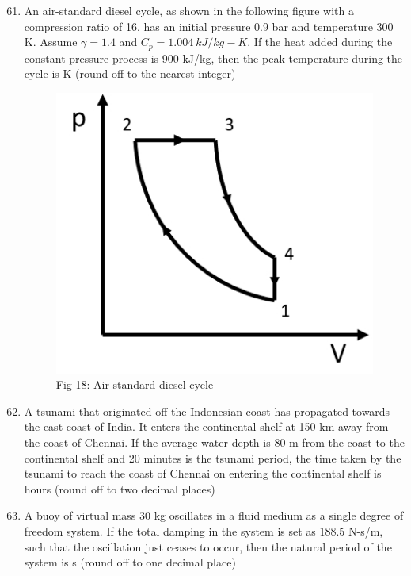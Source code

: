 \documentclass[journal]{IEEEtran}
\theoremstyle{remark}
\begin{document}
\begin{enumerate}[itemsep=1em]
\setcounter{enumi}{60}
\item An air-standard diesel cycle, as shown in the following figure with a compression ratio of 16, has an initial pressure 0.9 bar and temperature 300 K. Assume $\gamma=1.4$ and $C_p = 1.004\ kJ/kg-K$. If the heat added during the constant pressure 
process is 900 kJ/kg, then the peak temperature during the cycle is \underline{\hspace{1cm}} K (round off to the nearest integer) 
\begin{figure}[H]
    \centering
    \includegraphics[width=0.4\columnwidth]{figs/fig-18.jpeg}
    \caption*{Fig-18: Air-standard diesel cycle}
    \label{fig-18}
\end{figure}
\end{enumerate}

\begin{enumerate}[itemsep=1em]
\setcounter{enumi}{61}
\item A tsunami that originated off the Indonesian coast has propagated towards the east-coast of India. It enters the continental shelf at 150 km away from the coast of Chennai. If the average water depth is 80 m from the coast to the continental shelf and 20 minutes is the tsunami period, the time taken by the tsunami to reach the coast of Chennai on entering the continental shelf is \underline{\hspace{1cm}} hours (round off to two decimal places) 
\end{enumerate}

\begin{enumerate}[itemsep=1em]
\setcounter{enumi}{62}
\item A buoy of virtual mass 30 kg oscillates in a fluid medium as a single degree of freedom system. If the total damping in the system is set as 188.5 N-s/m, such that the oscillation just ceases to occur, then the natural period of the system is 
\underline{\hspace{1cm}} s (round off to one decimal place) 
\end{enumerate}
\end{document}
